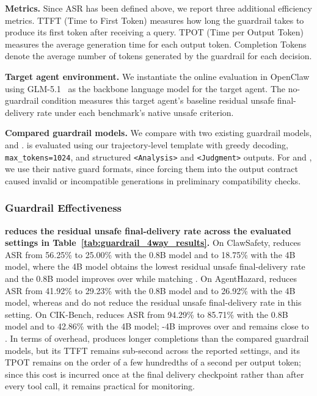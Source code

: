 \textbf{Metrics.} Since ASR has been defined above, we report three additional efficiency metrics. TTFT (Time to First Token) measures how long the guardrail takes to produce its first token after receiving a query. TPOT (Time per Output Token) measures the average generation time for each output token. Completion Tokens denote the average number of tokens generated by the guardrail for each decision.


\textbf{Target agent environment.}
We instantiate the online evaluation in OpenClaw using GLM-5.1~\citep{glm5team2026glm5} as the backbone language model for the target agent.
The no-guardrail condition measures this target agent's baseline residual unsafe final-delivery rate under each benchmark's native unsafe criterion.

\textbf{Compared guardrail models.}
We compare \agentdog{} with two existing guardrail models, \qwenguard{} and \llamaguard{}.
\agentdog{} is evaluated using our trajectory-level \prereply{} template with greedy decoding, \texttt{max\_tokens=1024}, and structured \texttt{<Analysis>} and \texttt{<Judgment>} outputs.
For \qwenguard{} and \llamaguard{}, we use their native guard formats, since forcing them into the \agentdog{} output contract caused invalid or incompatible generations in preliminary compatibility checks.

\subsubsection{Guardrail Effectiveness}

\textbf{\agentdog{} reduces the residual unsafe final-delivery rate across the evaluated settings in Table~\ref{tab:guardrail_4way_results}.}
On ClawSafety, \agentdog{} reduces ASR from 56.25\% to 25.00\% with the 0.8B model and to 18.75\% with the 4B model, where the 4B model obtains the lowest residual unsafe final-delivery rate and the 0.8B model improves over \qwenguard{} while matching \llamaguard{}.
On AgentHazard, \agentdog{} reduces ASR from 41.92\% to 29.23\% with the 0.8B model and to 26.92\% with the 4B model, whereas \qwenguard{} and \llamaguard{} do not reduce the residual unsafe final-delivery rate in this setting.
On CIK-Bench, \agentdog{} reduces ASR from 94.29\% to 85.71\% with the 0.8B model and to 42.86\% with the 4B model; \agentdog{}-4B improves over \qwenguard{} and remains close to \llamaguard{}.
In terms of overhead, \agentdog{} produces longer completions than the compared guardrail models, but its TTFT remains sub-second across the reported settings, and its TPOT remains on the order of a few hundredths of a second per output token; since this cost is incurred once at the final delivery checkpoint rather than after every tool call, it remains practical for \prereply{} monitoring.

